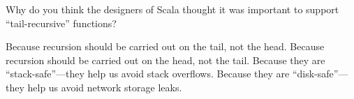 \begin{questions}
    \newpage


 \question[3]



   Why do you think the designers of Scala thought it was important to support ``tail-recursive'' functions?

    \begin{checkboxes}
      \choice Because recursion should be carried out on the tail, not the head.
      \choice Because recursion should be carried out on the head, not the tail.
      \CorrectChoice Because they are ``stack-safe''---they help us avoid stack overflows.
      \choice Because they are ``disk-safe''---they help us avoid network storage leaks.
    \end{checkboxes}

\end{questions}
